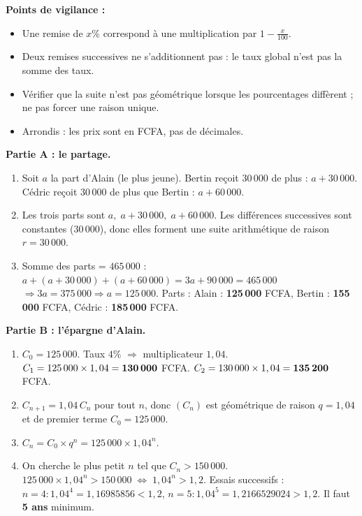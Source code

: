 \documentclass[11pt]{article}
\newcommand{\cle}[1]{{\popxbold\color{popdark}#1}}
\begin{document}
\begin{corrige}
\textbf{Points de vigilance :}
\begin{itemize}
\item Une remise de $x\%$ correspond à une multiplication par $1-\frac{x}{100}$.
\item Deux remises successives ne s'additionnent pas : le taux global n'est pas la somme des taux.
\item Vérifier que la suite n'est pas géométrique lorsque les pourcentages diffèrent ; ne pas forcer une raison unique.
\item Arrondis : les prix sont en FCFA, pas de décimales.
\end{itemize}
\end{corrige}

\begin{corrige}
\textbf{Partie A : le partage.}
\begin{enumerate}
\item Soit $a$ la part d'Alain (le plus jeune).
  Bertin reçoit $30\,000$ de plus : $a + 30\,000$.
  Cédric reçoit $30\,000$ de plus que Bertin : $a + 60\,000$.
\item Les trois parts sont $a,\; a+30\,000,\; a+60\,000$. Les différences successives sont constantes ($30\,000$), donc elles forment une \cle{suite arithmétique} de raison $r = 30\,000$.
\item Somme des parts = $465\,000$ :
  $a + (a+30\,000) + (a+60\,000) = 3a + 90\,000 = 465\,000$
  $\Rightarrow 3a = 375\,000 \Rightarrow a = 125\,000$.
  Parts :
  Alain : \textbf{125\,000} FCFA,
  Bertin : \textbf{155\,000} FCFA,
  Cédric : \textbf{185\,000} FCFA.
\end{enumerate}

\textbf{Partie B : l'épargne d'Alain.}
\begin{enumerate}
\item $C_0 = 125\,000$. Taux $4\%$ $\Rightarrow$ multiplicateur $1,04$.
  $C_1 = 125\,000 \times 1,04 = \textbf{130\,000}$ FCFA.
  $C_2 = 130\,000 \times 1,04 = \textbf{135\,200}$ FCFA.
\item $C_{n+1} = 1,04\,C_n$ pour tout $n$, donc $(C_n)$ est \cle{géométrique} de raison $q = 1,04$ et de premier terme $C_0 = 125\,000$.
\item $C_n = C_0 \times q^n = 125\,000 \times 1,04^n$.
\item On cherche le plus petit $n$ tel que $C_n > 150\,000$.
  $125\,000 \times 1,04^n > 150\,000 \;\Leftrightarrow\; 1,04^n > 1,2$.
  Essais successifs :
  $n=4 : 1,04^4 = 1,16985856 < 1,2$,
  $n=5 : 1,04^5 = 1,2166529024 > 1,2$.
  Il faut \textbf{5 ans} minimum.
\end{enumerate}


\end{corrige}
\end{document}

